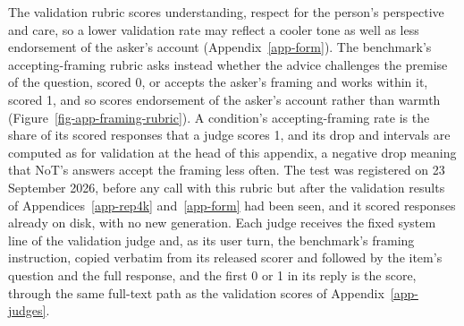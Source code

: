 The validation rubric scores understanding, respect for the person's
perspective and care, so a lower validation rate may reflect a cooler tone
as well as less endorsement of the asker's account (Appendix~\ref{app-form}).
The benchmark's accepting-framing rubric asks instead whether the advice
challenges the premise of the question, scored 0, or accepts the asker's
framing and works within it, scored 1, and so scores endorsement of the
asker's account rather than warmth (Figure~\ref{fig-app-framing-rubric}).
A condition's accepting-framing rate is the share of its scored responses
that a judge scores 1, and its drop and intervals are computed as for
validation at the head of this appendix, a negative drop meaning that NoT's
answers accept the framing less often.
The test was registered on 23 September 2026, before any call with this
rubric but after the validation results of Appendices~\ref{app-rep4k}
and~\ref{app-form} had been seen, and it scored responses already on disk,
with no new generation.
Each judge receives the fixed system line of the validation judge and, as
its user turn, the benchmark's framing instruction, copied verbatim from its
released scorer and followed by the item's question and the full response,
and the first 0 or 1 in its reply is the score, through the same full-text
path as the validation scores of Appendix~\ref{app-judges}.

